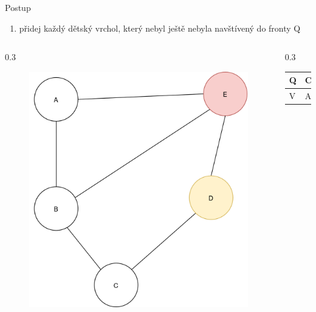 \documentclass[hyperref={unicode}]{beamer}
\begin{document}
\begin{frame}
\begin{block}{Postup}
\begin{enumerate}
  [default]
    \item přidej každý dětský vrchol, který nebyl ještě nebyla navštívený do fronty Q
\end{enumerate}
\end{block}
  \begin{columns}[T]
    \begin{column}{0.3\linewidth}
        \begin{figure}
        \includegraphics[width=\linewidth]{state6.png}
        \end{figure}
    \end{column}
    \begin{column}{0.3\linewidth}
    \begin{table}[]
        \begin{tabular}{|l||l|l|l|}
        \hline
        Q & C & D &  \\ \hline
        V & A & B & E  \\ \hline
        \end{tabular}
\end{table}
    \end{column}
  \end{columns}
\end{frame}
\end{document}
